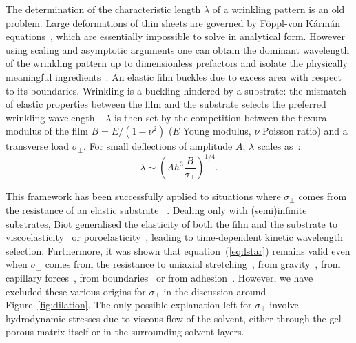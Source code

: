 \documentclass[twocolumn,superscriptaddress,showpacs,preprintnumbers, amsmath,amssymb,prl]{revtex4-1}
\begin{document}

The determination of the characteristic length $\lambda$ of a wrinkling pattern is an old problem. Large deformations of thin sheets are governed by F\"{o}ppl-von K\'arm\'an equations~\cite{landau1986}, which are essentially impossible to solve in analytical form. However using scaling and asymptotic arguments one can obtain the dominant wavelength of the wrinkling pattern up to dimensionless prefactors and isolate the physically meaningful ingredients~\cite{Cerda2003,Davidovitch2011}. An elastic film buckles due to excess area with respect to its boundaries. Wrinkling is a buckling hindered by a substrate: the mismatch of elastic properties between the film and the substrate selects the preferred wrinkling wavelength~\cite{Gough1940, Bijlaard1946}. $\lambda$ is then set by the competition between the flexural modulus of the film $B=E/(1-\nu^2)$ ($E$ Young modulus, $\nu$ Poisson ratio) and a transverse load $\sigma_\perp$. For small deflections of  amplitude $A$, $\lambda$ scales as~\cite{Vella2009,Kolinski2009}: 
%
\begin{equation}
\lambda \sim \left( A h^3 \frac{B}{\sigma_{\perp}} \right)^{1/4}.
\label{eq:lstar}
\end{equation}



This framework has been successfully applied to situations where $\sigma_{\perp}$ comes from the resistance of an elastic substrate ~\cite{Gough1940, Bijlaard1946}. Dealing only with (semi)infinite substrates, Biot generalised the elasticity of both the film and the substrate to viscoelasticity~\cite{Biot1957} or poroelasticity~\cite{Biot1964}, leading to time-dependent kinetic wavelength selection. Furthermore, it was shown that equation~(\ref{eq:lstar}) remains valid even when $\sigma_{\perp}$ comes from the resistance to uniaxial stretching~\cite{Cerda2003}, from gravity~\cite{Smoluchowski1910, Kolinski2009, Vella2009, Pineirua2013, Lucantonio2013}, from capillary forces~\cite{Huang2007}, from boundaries~\cite{Vandeparre2011a, Li2013} or from adhesion~\cite{Vella2009a}. However, we have excluded these various origins for $\sigma_{\perp}$ in the discussion around Figure~\ref{fig:dilation}.
%
The only possible explanation left for $\sigma_{\perp}$ involve hydrodynamic stresses due to viscous flow of the solvent, either through the gel porous matrix itself or in the surrounding solvent layers.
\end{document}
